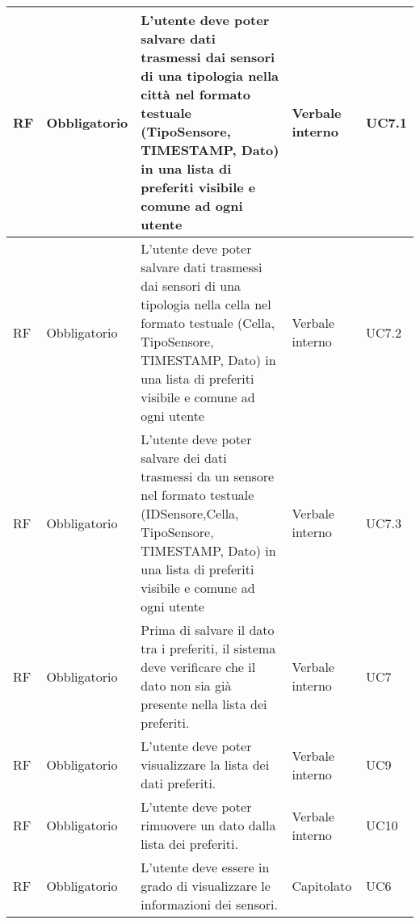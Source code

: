 \begin{longtable}{|C{1cm}|C{2cm}|>{\raggedright}m{5cm}|C{2cm}|C{1.5cm}|}
    \hline
     RF & Obbligatorio        & L'utente deve poter salvare dati trasmessi dai sensori di una tipologia nella città nel formato testuale (TipoSensore, TIMESTAMP, Dato) in una lista di preferiti visibile e comune ad ogni utente                                & Verbale interno & UC7.1               \\
    \hline
     RF & Obbligatorio        & L'utente deve poter salvare dati trasmessi dai  sensori di una tipologia nella cella nel formato testuale (Cella, TipoSensore, TIMESTAMP, Dato) in una lista di preferiti visibile e comune ad ogni utente                         & Verbale interno & UC7.2               \\
    \hline
     RF & Obbligatorio        & L'utente deve poter salvare dei dati trasmessi da un sensore nel formato testuale (IDSensore,Cella, TipoSensore, TIMESTAMP, Dato) in una lista di preferiti visibile e comune ad ogni utente                                       & Verbale interno & UC7.3               \\
    \hline
     RF & Obbligatorio        & Prima di salvare il dato tra i preferiti, il sistema deve verificare che il dato non sia già presente nella lista dei preferiti.                                                                                                   & Verbale interno      & UC7               \\
    \hline
     RF & Obbligatorio        & L'utente deve poter visualizzare la lista dei dati preferiti.                                                                                                                                                                       & Verbale interno & UC9                 \\
    \hline
     RF & Obbligatorio        & L'utente deve poter rimuovere un dato dalla lista dei preferiti.                                                                                                                                                                    & Verbale interno & UC10               \\
    \hline
     RF & Obbligatorio        & L'utente deve essere in grado di visualizzare le informazioni dei sensori.                                                                                                                                                           & Capitolato      & UC6               \\

\end{longtable}
